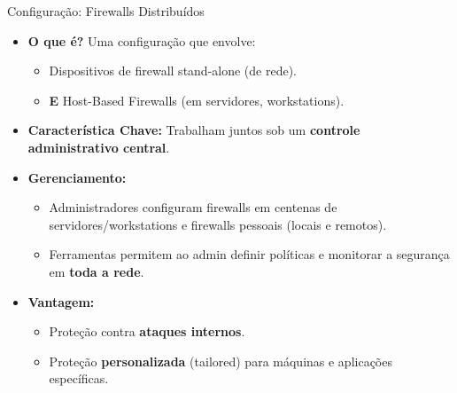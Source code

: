 \begin{frame}{Configuração: Firewalls Distribuídos}
    \begin{itemize}
        \item \textbf{O que é?} Uma configuração que envolve:
              \begin{itemize}
                  \item Dispositivos de firewall stand-alone (de rede).
                  \item \textbf{E} Host-Based Firewalls (em servidores, workstations).
              \end{itemize}

        \item \textbf{Característica Chave:} Trabalham juntos sob um \textbf{controle administrativo central}.

        \item \textbf{Gerenciamento:}
              \begin{itemize}
                  \item Administradores configuram firewalls em centenas de servidores/workstations e firewalls pessoais (locais e remotos).
                  \item Ferramentas permitem ao admin definir políticas e monitorar a segurança em \textbf{toda a rede}.
              \end{itemize}

        \item \textbf{Vantagem:}
              \begin{itemize}
                  \item Proteção contra \textbf{ataques internos}.
                  \item Proteção \textbf{personalizada} (tailored) para máquinas e aplicações específicas.
              \end{itemize}
    \end{itemize}
\end{frame}

